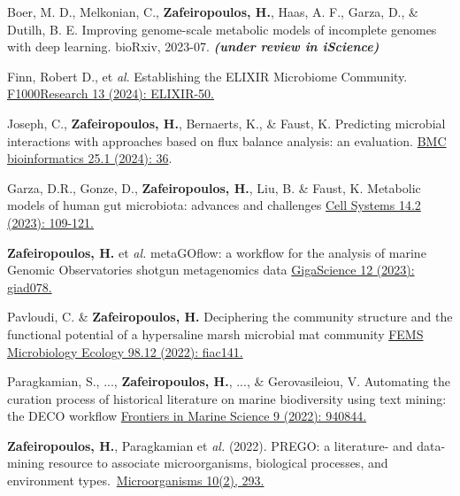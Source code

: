 \documentclass{beamer}
\begin{document}
\begin{darkframes}
\begin{frame}[label=bibliography]{}
\begin{thebibliography}{9}
         \tiny
            Boer, M. D., Melkonian, C., \textbf{Zafeiropoulos, H.}, Haas, A. F., Garza, D., \& Dutilh, B. E. 
            Improving genome-scale metabolic models of incomplete genomes with deep learning. 
            bioRxiv, 2023-07. \textbf{\textit{(under review in iScience)}}

         \tiny
            Finn, Robert D., et \textit{al}. Establishing the ELIXIR Microbiome Community.
            \href{https://doi.org/10.12688/f1000research.144515.1}{F1000Research 13 (2024): ELIXIR-50.}

         \tiny
            Joseph, C., \textbf{Zafeiropoulos, H.}, Bernaerts, K., \& Faust, K. 
            Predicting microbial interactions with approaches based on flux balance analysis: an evaluation.
            \href{https://doi.org/10.1186/s12859-024-05651-7}{BMC bioinformatics 25.1 (2024): 36}.

 
         \tiny
            Garza, D.R., Gonze, D., \textbf{Zafeiropoulos, H.}, Liu, B. \& Faust, K.
            Metabolic models of human gut microbiota: advances and challenges 
            \href{https://doi.org/10.1016/j.cels.2022.11.002}{Cell Systems 14.2 (2023): 109-121.}


         \tiny
            \textbf{Zafeiropoulos, H.} et \textit{al.} 
            metaGOflow: a workflow for the analysis of marine Genomic Observatories shotgun metagenomics data
            \href{https://doi.org/10.1093/gigascience/giad078}{GigaScience 12 (2023): giad078.}

         \tiny	
            Pavloudi, C. \& \textbf{Zafeiropoulos, H.}
            Deciphering the community structure and the functional potential of a hypersaline marsh microbial mat community
            \href{https://doi.org/10.1093/femsec/fiac141}{FEMS Microbiology Ecology 98.12 (2022): fiac141.}

         \tiny 
            Paragkamian, S., ..., \textbf{Zafeiropoulos, H.}, ..., \& Gerovasileiou, V. 
            Automating the curation process of historical literature on marine biodiversity using text mining: the DECO workflow
            \href{https://doi.org/10.3389/fmars.2022.940844}{Frontiers in Marine Science 9 (2022): 940844.}

         \tiny
            \textbf{Zafeiropoulos, H.}, Paragkamian et \textit{al.} (2022). PREGO: a literature- and data-mining resource to associate microorganisms, biological processes, and environment types.~\href{https://www.mdpi.com/1469654}{Microorganisms  10(2), 293.}


\end{thebibliography}
\end{frame}
\end{darkframes}
\end{document}
